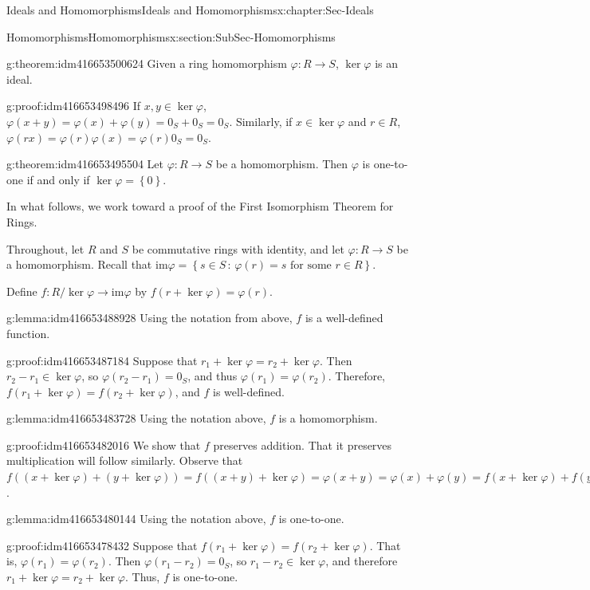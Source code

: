 \documentclass[oneside,10pt,]{book}
\numberwithin{equation}{section}
\def\p{\varphi}
\def\im{\text{im}}
\newcommand{\set}[1]{\left\{ {#1} \right\}}
\newcommand{\setof}[2]{{\left\{#1\,\colon\,#2\right\}}}
\begin{document}
\begin{chapterptx}{Ideals and Homomorphisms}{}{Ideals and Homomorphisms}{}{}{x:chapter:Sec-Ideals}
\begin{sectionptx}{Homomorphisms}{}{Homomorphisms}{}{}{x:section:SubSec-Homomorphisms}
\begin{theorem}{}{}{g:theorem:idm416653500624}
Given a ring homomorphism \(\p : R\to S\), \(\ker\p\) is an ideal.%
\end{theorem}
\begin{proofptx}{}{g:proof:idm416653498496}
If \(x,y\in \ker\p\), \(\p(x+y) = \p(x) + \p(y) = 0_S + 0_S = 0_S\). Similarly, if \(x\in \ker \p\) and \(r\in R\), \(\p(rx) = \p(r) \p(x) = \p(r) 0_S = 0_S\).%
\end{proofptx}
\begin{theorem}{}{}{g:theorem:idm416653495504}%
Let \(\p : R\to S\) be a homomorphism. Then \(\p\) is one-to-one if and only if \(\ker\p = \set{0}\).%
\end{theorem}
In what follows, we work toward a proof of the First Isomorphism Theorem for Rings.%
\par
Throughout, let \(R\) and \(S\) be commutative rings with identity, and let \(\p : R\to S\) be a homomorphism. Recall that \(\im \p = \setof{s\in S}{\p(r) = s\text{ for some } r\in R}\).%
\par
Define \(f: R/\ker \p \to \im \p\) by \(f(r+\ker \p) = \p(r)\).%
\begin{lemma}{}{}{g:lemma:idm416653488928}%
Using the notation from above, \(f\) is a well-defined function.%
\end{lemma}
\begin{proofptx}{}{g:proof:idm416653487184}
Suppose that \(r_1 + \ker\p = r_2 + \ker\p\). Then \(r_2-r_1 \in \ker\p\), so \(\p(r_2-r_1) = 0_S\), and thus \(\p(r_1) = \p(r_2)\). Therefore, \(f(r_1+\ker\p) = f(r_2+\ker\p)\), and \(f\) is well-defined.%
\end{proofptx}
\begin{lemma}{}{}{g:lemma:idm416653483728}%
Using the notation above, \(f\) is a homomorphism.%
\end{lemma}
\begin{proofptx}{}{g:proof:idm416653482016}
We show that \(f\) preserves addition. That it preserves multiplication will follow similarly. Observe that \(f((x+\ker\p) + (y+\ker\p)) = f((x+y)+\ker\p) = \p(x+y) = \p(x)+\p(y) = f(x+\ker\p) + f(y+\ker\p)\).%
\end{proofptx}
\begin{lemma}{}{}{g:lemma:idm416653480144}%
Using the notation above, \(f\) is one-to-one.%
\end{lemma}
\begin{proofptx}{}{g:proof:idm416653478432}
Suppose that \(f(r_1 + \ker\p) = f(r_2 + \ker\p)\). That is, \(\p(r_1) = \p(r_2)\). Then \(\p(r_1 - r_2) = 0_S\), so \(r_1 -r_2 \in \ker\p\), and therefore \(r_1 + \ker\p = r_2 + \ker \p\). Thus, \(f\) is one-to-one.%

\end{proofptx}
\end{sectionptx}
\end{chapterptx}
\end{document}
